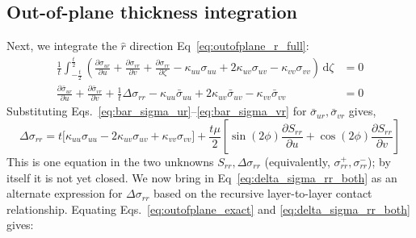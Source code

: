 \documentclass[11pt]{article}
\begin{document}
\subsection{Out-of-plane thickness integration}\label{sec:thickness_integration_outofplane}
Next, we integrate the $\hat r$ direction Eq~\eqref{eq:outofplane_r_full}:
\begin{align}
    \frac{1}{t}\int_{-\frac{t}{2}}^{\frac{t}{2}}\left(\frac{\partial\sigma_{ur}}{\partial u}+\frac{\partial\sigma_{vr}}{\partial v}+\frac{\partial\sigma_{rr}}{\partial\zeta} - \kappa_{uu}\sigma_{uu}+2\kappa_{uv}\sigma_{uv}-\kappa_{vv}\sigma_{vv}\right)\,\mathrm d\zeta &= 0\\
    \frac{\partial\bar\sigma_{ur}}{\partial u} + \frac{\partial\bar\sigma_{vr}}{\partial v} + \frac{1}{t}\Delta \sigma_{rr} - \kappa_{uu}\bar\sigma_{uu}+2\kappa_{uv}\bar\sigma_{uv}-\kappa_{vv}\bar\sigma_{vv} &= 0
\end{align}
Substituting Eqs.~\eqref{eq:bar_sigma_ur}--\eqref{eq:bar_sigma_vr} for $\bar\sigma_{ur},\bar\sigma_{vr}$ gives,
\begin{equation}\label{eq:outofplane_exact}
    \Delta \sigma_{rr} = t\big[\kappa_{uu}\sigma_{uu}-2\kappa_{uv}\sigma_{uv}+\kappa_{vv}\sigma_{vv}\big] + \frac{t\mu}{2}\left[\sin(2\phi)\frac{\partial S_{rr}}{\partial u}+\cos(2\phi)\frac{\partial S_{rr}}{\partial v}\right]
\end{equation}
This is one equation in the two unknowns $S_{rr},\Delta\sigma_{rr}$ (equivalently, $\sigma_{rr}^+,\sigma_{rr}^-$); by itself it is not yet closed. We now bring in Eq~\eqref{eq:delta_sigma_rr_both} as an alternate expression for $\Delta\sigma_{rr}$ based on the recursive layer-to-layer contact relationship. Equating Eqs.~\eqref{eq:outofplane_exact} and \eqref{eq:delta_sigma_rr_both} gives:
\end{document}
